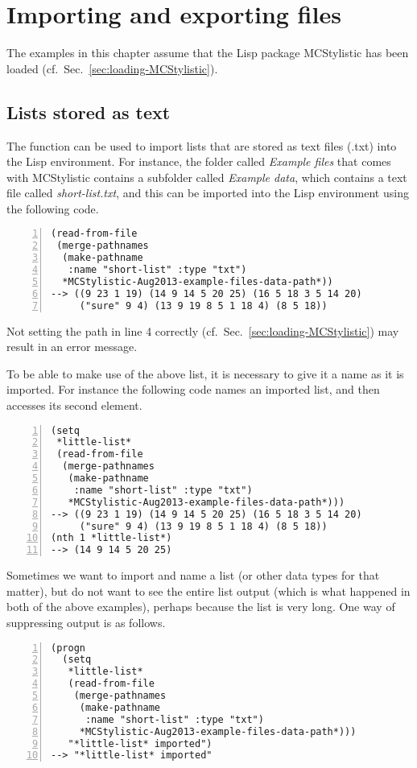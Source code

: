 \chapter{Importing and exporting files}\label{chap:import-export}

The examples in this chapter assume that the Lisp package MCStylistic has been loaded (cf.~Sec.~\ref{sec:loading-MCStylistic}).

\section{Lists stored as text}\label{sec:text-lists}

The function  can be used to import lists that are stored as text files (.txt) into the Lisp environment. For instance, the folder called \emph{Example files} that comes with MCStylistic contains a subfolder called \emph{Example data}, which contains a text file called \emph{short-list.txt}, and this can be imported into the Lisp environment using the following code.
\begin{Verbatim}[frame=single,numbers=left]
(read-from-file
 (merge-pathnames
  (make-pathname
   :name "short-list" :type "txt")
  *MCStylistic-Aug2013-example-files-data-path*))
--> ((9 23 1 19) (14 9 14 5 20 25) (16 5 18 3 5 14 20)
     ("sure" 9 4) (13 9 19 8 5 1 18 4) (8 5 18))
\end{Verbatim}
Not setting the path in line 4 correctly (cf.~Sec.~\ref{sec:loading-MCStylistic}) may result in an error message.

To be able to make use of the above list, it is necessary to give it a name as it is imported. For instance the following code names an imported list, and then accesses its second element.
\begin{Verbatim}[frame=single,numbers=left]
(setq
 *little-list*
 (read-from-file
  (merge-pathnames
   (make-pathname
    :name "short-list" :type "txt")
   *MCStylistic-Aug2013-example-files-data-path*)))
--> ((9 23 1 19) (14 9 14 5 20 25) (16 5 18 3 5 14 20)
     ("sure" 9 4) (13 9 19 8 5 1 18 4) (8 5 18))
(nth 1 *little-list*)
--> (14 9 14 5 20 25)
\end{Verbatim}

Sometimes we want to import and name a list (or other data types for that matter), but do not want to see the entire list output (which is what happened in both of the above examples), perhaps because the list is very long. One way of suppressing output is as follows.
\begin{Verbatim}[frame=single,numbers=left]
(progn
  (setq
   *little-list*
   (read-from-file
    (merge-pathnames
     (make-pathname
      :name "short-list" :type "txt")
     *MCStylistic-Aug2013-example-files-data-path*)))
   "*little-list* imported")
--> "*little-list* imported"
\end{Verbatim}

